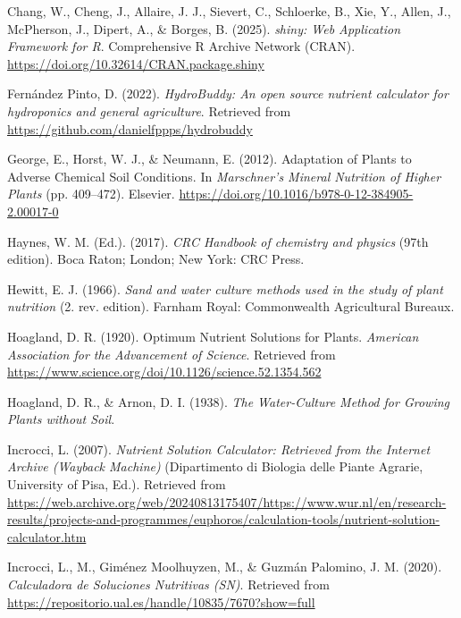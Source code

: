 \documentclass[
  letterpaper,
  DIV=11,
  numbers=noendperiod]{scrreprt}
\newlength{\cslhangindent}
\newenvironment{CSLReferences}[2] %
 {\begin{list}{}{%
  \setlength{\itemindent}{0pt}
  \setlength{\leftmargin}{0pt}
  \setlength{\parsep}{0pt}
  \ifodd #1
   \setlength{\leftmargin}{\cslhangindent}
   \setlength{\itemindent}{-1\cslhangindent}
  \fi
  \setlength{\itemsep}{#2\baselineskip}}}
 {\end{list}}
\begin{document}
\begin{CSLReferences}{1}{0}
Chang, W., Cheng, J., Allaire, J. J., Sievert, C., Schloerke, B., Xie,
Y., Allen, J., McPherson, J., Dipert, A., \& Borges, B. (2025).
\emph{{shiny: Web Application Framework for R}}. {Comprehensive R
Archive Network (CRAN)}.
\url{https://doi.org/10.32614/CRAN.package.shiny}

Fernández Pinto, D. (2022). \emph{{HydroBuddy: An open source nutrient
calculator for hydroponics and general agriculture}}. Retrieved from
\url{https://github.com/danielfppps/hydrobuddy}

George, E., Horst, W. J., \& Neumann, E. (2012). {Adaptation of Plants
to Adverse Chemical Soil Conditions}. In \emph{{Marschner's Mineral
Nutrition of Higher Plants}} (pp. 409--472). Elsevier.
\url{https://doi.org/10.1016/b978-0-12-384905-2.00017-0}

Haynes, W. M. (Ed.). (2017). \emph{{CRC Handbook of chemistry and
physics}} (97th edition). Boca Raton; London; New York: {CRC Press}.

Hewitt, E. J. (1966). \emph{{Sand and water culture methods used in the
study of plant nutrition}} (2. rev. edition). Farnham Royal:
{Commonwealth Agricultural Bureaux}.

Hoagland, D. R. (1920). {Optimum Nutrient Solutions for Plants}.
\emph{{American Association for the Advancement of Science}}. Retrieved
from \url{https://www.science.org/doi/10.1126/science.52.1354.562}

Hoagland, D. R., \& Arnon, D. I. (1938). \emph{{The Water-Culture Method
for Growing Plants without Soil}}.

Incrocci, L. (2007). \emph{{Nutrient Solution Calculator: Retrieved from
the Internet Archive (Wayback Machine)}} (Dipartimento di Biologia delle
Piante Agrarie, University of Pisa, Ed.). Retrieved from
\url{https://web.archive.org/web/20240813175407/https://www.wur.nl/en/research-results/projects-and-programmes/euphoros/calculation-tools/nutrient-solution-calculator.htm}

Incrocci, L., M., Giménez Moolhuyzen, M., \& Guzmán Palomino, J. M.
(2020). \emph{{Calculadora de Soluciones Nutritivas (SN)}}. Retrieved
from \url{https://repositorio.ual.es/handle/10835/7670?show=full}


\end{CSLReferences}
\end{document}
